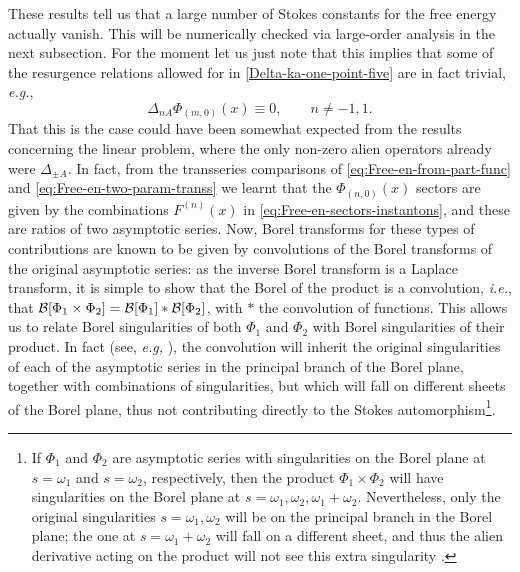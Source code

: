 \documentclass[11pt,a4paper]{article}
\newcommand{\CB}{{\cal B}}
\begin{document}
These results tell us that a large number of Stokes constants for the free energy actually vanish. This will be numerically checked via large-order analysis in the next subsection. For the moment let us just note that this implies that some of the resurgence relations allowed for in \eqref{Delta-ka-one-point-five} are in fact trivial, \textit{e.g.},
%
\begin{equation}
\Delta_{nA}\Phi_{(m,0)}(x) \equiv 0, \qquad n\ne-1,1.
\end{equation}
%
\noindent
That this is the case could have been somewhat expected from the results concerning the linear problem, where the only non-zero alien operators already were $\Delta_{\pm A}$. In fact, from the transseries comparisons of \eqref{eq:Free-en-from-part-func} and \eqref{eq:Free-en-two-param-transs} we learnt that the $\Phi_{(n,0)} (x)$ sectors are given by the combinations $F^{(n)} (x)$ in \eqref{eq:Free-en-sectors-instantons}, and these are ratios of two asymptotic series. Now, Borel transforms for these types of contributions are known to be given by convolutions of the Borel transforms of the original asymptotic series: as the inverse Borel transform is a Laplace transform, it is simple to show that the Borel of the product is a convolution, \textit{i.e.}, that $\CB [ \Phi_1 \times \Phi_2 ] = \CB [\Phi_1] * \CB [\Phi_2]$, with $*$ the convolution of functions. This allows us to relate Borel singularities of both $\Phi_1$ and $\Phi_2$ with Borel singularities of their product. In fact (see, \textit{e.g,} \cite{s14}), the convolution will inherit the original singularities of each of the asymptotic series in the principal branch of the Borel plane, together with combinations of singularities, but which will fall on different sheets of the Borel plane, thus not contributing directly to the Stokes automorphism\footnote{If $\Phi_{1}$ and $\Phi_{2}$ are asymptotic series with singularities on the Borel plane at $s=\omega_{1}$ and $s=\omega_{2}$, respectively, then the product $\Phi_{1} \times \Phi_{2}$ will have singularities on the Borel plane at $s=\omega_{1},\omega_{2},\omega_{1}+\omega_{2}$. Nevertheless, only the original singularities $s=\omega_{1},\omega_{2}$ will be on the principal branch in the Borel plane; the one at $s=\omega_{1}+\omega_{2}$ will fall on a different sheet, and thus the alien derivative acting on the product will not see this extra singularity \cite{s14}.}.
\end{document}
